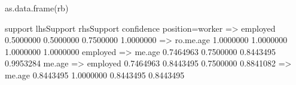 \begin{Schunk}
% --begin: "searchrules3"
\begin{Sinput}
 as.data.frame(rb)
\end{Sinput}
\begin{Soutput}
                              support lhsSupport rhsSupport confidence
position=worker => employed 0.5000000  0.5000000  0.7500000  1.0000000
 => ro.me.age               1.0000000  1.0000000  1.0000000  1.0000000
employed => me.age          0.7464963  0.7500000  0.8443495  0.9953284
me.age => employed          0.7464963  0.8443495  0.7500000  0.8841082
 => me.age                  0.8443495  1.0000000  0.8443495  0.8443495
\end{Soutput}
%
% --end: "searchrules3"
\end{Schunk}
